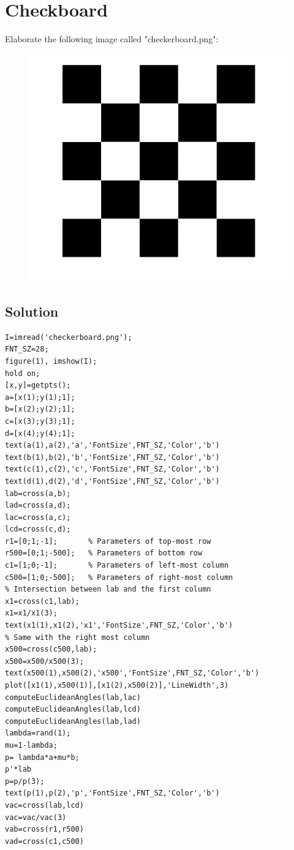 \documentclass[12pt, a4paper]{report}
\begin{document}
\section{Checkboard}
    Elaborate the following image called "checkerboard.png": 
    \begin{figure}[H]
        \centering
        \includegraphics[width=0.5\linewidth]{images/checkerboard.png}
    \end{figure}
\subsection*{Solution}

    \begin{lstlisting}[style=Matlab]
I=imread('checkerboard.png');
FNT_SZ=28;
figure(1), imshow(I);
hold on;
[x,y]=getpts();
a=[x(1);y(1);1];
b=[x(2);y(2);1];
c=[x(3);y(3);1];
d=[x(4);y(4);1];
text(a(1),a(2),'a','FontSize',FNT_SZ,'Color','b')
text(b(1),b(2),'b','FontSize',FNT_SZ,'Color','b')
text(c(1),c(2),'c','FontSize',FNT_SZ,'Color','b')
text(d(1),d(2),'d','FontSize',FNT_SZ,'Color','b')
lab=cross(a,b); 
lad=cross(a,d); 
lac=cross(a,c); 
lcd=cross(c,d);
r1=[0;1;-1];       % Parameters of top-most row
r500=[0;1;-500];   % Parameters of bottom row
c1=[1;0;-1];       % Parameters of left-most column
c500=[1;0;-500];   % Parameters of right-most column
% Intersection between lab and the first column
x1=cross(c1,lab); 
x1=x1/x1(3); 
text(x1(1),x1(2),'x1','FontSize',FNT_SZ,'Color','b')
% Same with the right most column
x500=cross(c500,lab);
x500=x500/x500(3);
text(x500(1),x500(2),'x500','FontSize',FNT_SZ,'Color','b')
plot([x1(1),x500(1)],[x1(2),x500(2)],'LineWidth',3)
computeEuclideanAngles(lab,lac) 
computeEuclideanAngles(lab,lcd) 
computeEuclideanAngles(lab,lad) 
lambda=rand(1);
mu=1-lambda;
p= lambda*a+mu*b;
p'*lab
p=p/p(3);
text(p(1),p(2),'p','FontSize',FNT_SZ,'Color','b')
vac=cross(lab,lcd)
vac=vac/vac(3) 
vab=cross(r1,r500)
vad=cross(c1,c500)
    \end{lstlisting}
\end{document}
